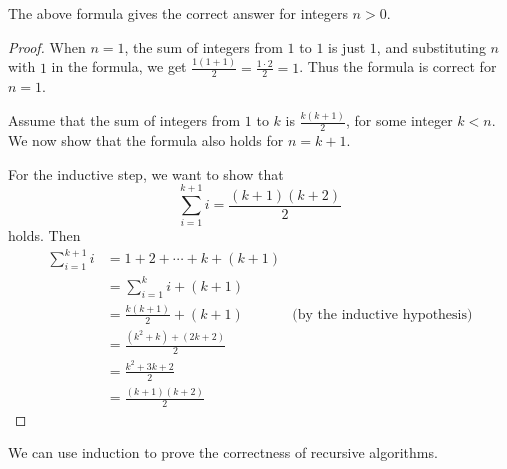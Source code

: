 \begin{claim}
The above formula gives the correct answer for integers $n>0$.
\end{claim}
\begin{proof}
    When $n=1$, the sum of integers from $1$ to $1$ is just $1$, and substituting $n$ with $1$ in the formula, we get $\frac{1\left(1+1\right)}{2} = \frac{1\cdot 2}{2} = 1$. Thus the formula is correct for $n=1$.

    Assume that the sum of integers from $1$ to $k$ is $\frac{k\left(k+1\right)}{2}$, for some integer $k < n$. We now show that the formula also holds for $n = k+1$.

    For the inductive step, we want to show that
\[
    \sum_{i=1}^{k+1} i = \frac{\left(k+1\right) \left(k+2\right)}{2}
\]
holds. Then
    \begin{align*}
        \sum_{i=1}^{k+1} i &= 1 + 2 + \cdots + k + \left(k+1\right) \\
        &= \sum_{i=1}^{k} i + \left(k+1\right) \\
        &= \frac{k\left(k+1\right)}{2} + \left(k+1\right) & \text{(by the inductive hypothesis)} \\
        &= \frac{\left(k^2 + k\right) + \left(2k + 2\right)}{2} \\
        &= \frac{k^2 + 3k + 2}{2} \\
        &= \frac{\left(k+1\right) \left(k+2\right)}{2}
    \end{align*}
\end{proof}

We can use induction to prove the correctness of recursive algorithms.

